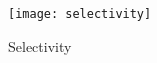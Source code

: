 \begin{figure}[!ht]
	\centering
	\texttt{[image: selectivity]}
	\caption{Selectivity}%
	\label{figure:selectivity}
\end{figure}
